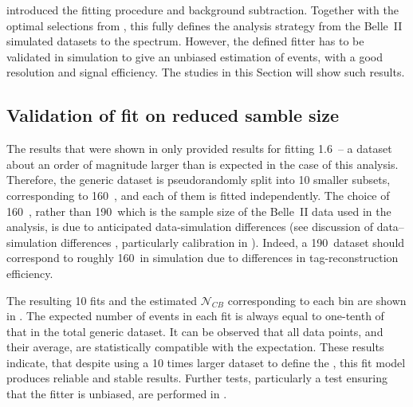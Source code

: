  introduced the fitting procedure and \BB background subtraction.
Together with the optimal selections from , this fully defines the analysis strategy from the Belle~II simulated datasets to the \BtoXsgamma spectrum.
However, the defined fitter has to be validated in simulation to give an unbiased estimation of \BtoXsgamma events, with a good resolution and signal efficiency.
The studies in this Section will show such results.

\subsection{Validation of \texorpdfstring{\Mbc}{Mbc} fit on reduced samble size}\label{sec:mbc_fit_validation_misreconstructed}

The results that were shown in  only provided results for fitting 1.6~\invab -- a dataset about an order of magnitude larger than is expected in the case of this analysis.
Therefore, the generic \MC dataset is pseudorandomly split into 10 smaller subsets, corresponding to 160~\invfb, and each of them is fitted independently.
The choice of 160~\invfb, rather than 190~\invfb which is the sample size of the Belle~II data used in the analysis, 
is due to anticipated data-simulation differences (see discussion of data--simulation differences , particularly \FEI calibration in ).
Indeed, a 190~\invfb dataset should correspond to roughly 160~\invfb in simulation due to differences in tag-\B reconstruction efficiency.

The resulting 10 fits and the estimated $\mathcal{N}_{CB}$ corresponding to each \EB bin are shown in .
The expected number of events in each fit is always equal to one-tenth of that in the total generic \MC dataset.
It can be observed that all data points, and their average, are statistically compatible with the expectation.
These results indicate, that despite using a 10 times larger dataset to define the , this \Mbc fit model produces reliable and stable results.
Further tests, particularly a test ensuring that the fitter is unbiased, are performed in .

